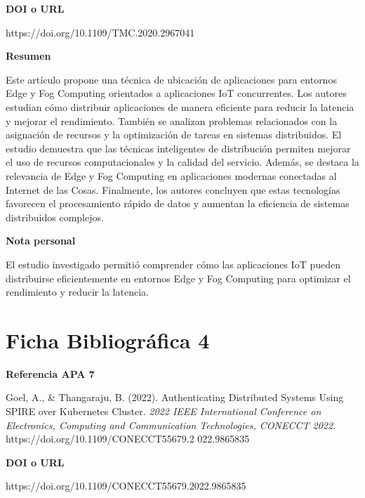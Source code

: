 \documentclass[12pt]{article}
\begin{document}
\vspace{0.3cm}

\textbf{DOI o URL}

https://doi.org/10.1109/TMC.2020.2967041

\vspace{0.3cm}

\textbf{Resumen}

Este artículo propone una técnica de ubicación de aplicaciones para entornos Edge y Fog Computing orientados a aplicaciones IoT concurrentes. Los autores estudian cómo distribuir aplicaciones de manera eficiente para reducir la latencia y mejorar el rendimiento. También se analizan problemas relacionados con la asignación de recursos y la optimización de tareas en sistemas distribuidos. El estudio demuestra que las técnicas inteligentes de distribución permiten mejorar el uso de recursos computacionales y la calidad del servicio. Además, se destaca la relevancia de Edge y Fog Computing en aplicaciones modernas conectadas al Internet de las Cosas. Finalmente, los autores concluyen que estas tecnologías favorecen el procesamiento rápido de datos y aumentan la eficiencia de sistemas distribuidos complejos.

 


\vspace{0.3cm}

\textbf{Nota personal}

El estudio investigado permitió comprender cómo las aplicaciones IoT pueden distribuirse eficientemente en entornos Edge y Fog Computing para optimizar el rendimiento y reducir la latencia. 


\section*{Ficha Bibliográfica 4}

\textbf{Referencia APA 7}

Goel, A., \& Thangaraju, B. (2022). Authenticating Distributed Systems Using SPIRE over Kubernetes Cluster. \textit{2022 IEEE International Conference on Electronics, Computing and Communication Technologies, CONECCT 2022}. https://doi.org/10.1109/CONECCT55679.2
022.9865835


\vspace{0.3cm}

\textbf{DOI o URL}

https://doi.org/10.1109/CONECCT55679.2022.9865835

\vspace{0.3cm}
\end{document}
